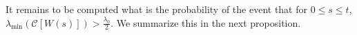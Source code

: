 \documentclass[a4paper,11pt]{amsart}
\newcommand{\IE}{\mathbb{E}}
\theoremstyle{definition}
\theoremstyle{plain}
\theoremstyle{remark}
\begin{document}
% 

It remains to be computed what is the probability of the event that for $0\leq s\leq t$, $\lambda_{\min}(\mathcal{C}[W(s)])>\frac{\lambda_0}{2}$. We summarize this in the next proposition.
\end{document}
